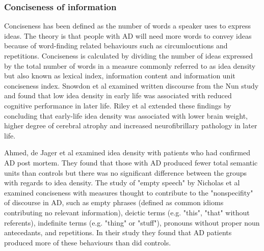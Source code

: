 \documentclass{article}
\begin{document}
\subsubsection{Conciseness of information}
Conciseness has been defined as the number of words a speaker uses to express ideas. The theory is that people with AD will need more words to convey ideas because of word-finding related behaviours such as circumlocutions and repetitions. Conciseness is calculated by dividing the number of ideas expressed by the total number of words in a measure commonly referred to as idea density but also known as lexical index, information content and information unit conciseness index. Snowdon et al examined written discourse from the Nun study and found that low idea density in early life was associated with reduced cognitive performance in later life. Riley et al extended these findings by concluding that early-life idea density was associated with lower brain weight, higher degree of cerebral atrophy and increased neurofibrillary pathology in later life. \newline
\par
Ahmed, de Jager et al examined idea density with patients who had confirmed AD post mortem. They found that those with AD produced fewer total semantic units than controls but there was no significant difference between the groups with regards to idea density. The study of "empty speech" by Nicholas et al examined conciseness with measures thought to contribute to the "nonspecifity" of discourse in AD, such as empty phrases (defined as common idioms contributing no relevant information), deictic terms (e.g. "this", "that" without referents), indefinite terms (e.g. "thing" or "stuff"), pronouns without proper noun antecedants, and repetitions. In their study they found that AD patients produced more of these behaviours than did controls. \newline
\par
\end{document}
